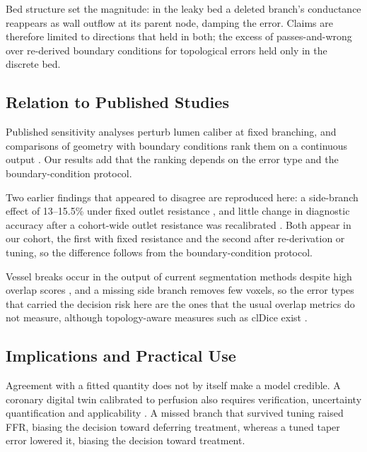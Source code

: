 \documentclass[journal,twoside,web]{ieeecolor}
\begin{document}
Bed structure set the magnitude: in the leaky bed a deleted branch's conductance reappears as wall outflow at its
parent node, damping the error. Claims are therefore limited to directions that held in both; the
excess of passes-and-wrong over re-derived boundary conditions for topological errors held only in the discrete bed.

\subsection{Relation to Published Studies}
Published sensitivity analyses perturb lumen caliber at fixed branching, and comparisons of geometry with boundary
conditions rank them on a continuous output \cite{sankaran2016,tanade2022,korte2023}. Our results add that the
ranking depends on the error type and the boundary-condition protocol.

Two earlier findings that appeared to disagree are reproduced here: a side-branch effect of 13--15.5\% under fixed
outlet resistance \cite{gamage2022}, and little change in diagnostic accuracy after a cohort-wide outlet resistance
was recalibrated \cite{gosling2020}. Both appear in our cohort, the first with fixed resistance and the second after re-derivation or tuning, so the difference follows
from the boundary-condition protocol.

Vessel breaks occur in the output of current segmentation methods despite high overlap scores \cite{bransby2026},
and a missing side branch removes few voxels, so the error types that carried the decision risk here are the ones that the usual overlap metrics do not measure, although topology-aware measures such as clDice
exist \cite{shit2021}.

\subsection{Implications and Practical Use}
Agreement with a fitted quantity does not by itself make a model credible. A coronary digital twin calibrated to perfusion also requires verification,
uncertainty quantification and applicability \cite{viceconti2025}. A missed branch that survived tuning raised FFR, biasing the decision toward
deferring treatment, whereas a tuned taper error lowered it, biasing the decision toward treatment.
\end{document}

